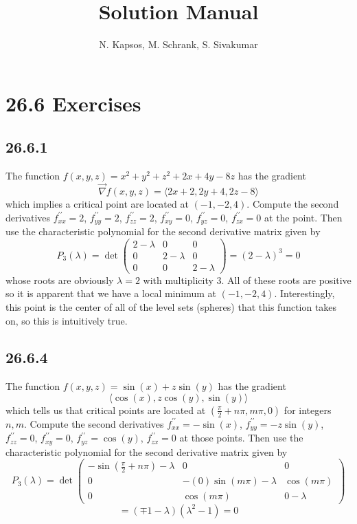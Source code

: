 \documentclass{article}
\title{Solution Manual}
\author{N. Kapsos, M. Schrank, S. Sivakumar}
\date{}
\begin{document}
\maketitle
\setcounter{secnumdepth}{0}

\section{26.6 Exercises}

\subsection{26.6.1}

The function $f(x,y,z) = x^2+y^2+z^2+2x + 4y-8z$ has the gradient $$\vec{\nabla}f(x,y,z) = \langle 2x+2, 2y+4 ,2z-8 \rangle$$ which implies a critical point are located at $(-1,-2,4)$. Compute the second derivatives $f^{\prime \prime}_{xx} = 2$, $f^{\prime \prime}_{yy} = 2$, $f^{\prime \prime}_{zz} = 2$, $f^{\prime \prime}_{xy} = 0$, $f^{\prime \prime}_{yz} = 0$, $f^{\prime \prime}_{zx} = 0$ at the point. Then use the characteristic polynomial for the second derivative matrix given by $$P_3(\lambda) = \det \begin{pmatrix}
    2-\lambda & 0 & 0 \\
    0 & 2-\lambda & 0 \\
    0 & 0 & 2-\lambda 
\end{pmatrix} = (2-\lambda)^3 = 0$$ whose roots are obviously $\lambda = 2$ with multiplicity $3$. All of these roots are positive so it is apparent that we have a local minimum at $(-1,-2,4)$. Interestingly, this point is the center of all of the level sets (spheres) that this function takes on, so this is intuitively true.
\subsection{26.6.4}

The function $f(x, y, z) = \sin (x) + z \sin (y)$ has the gradient $$\langle \cos(x), z\cos(y) ,\sin(y) \rangle$$ which tells us that critical points are located at $(\frac{\pi}{2}+n\pi,m\pi ,0)$ for integers $n,m$. Compute the second derivatives $f^{\prime \prime}_{xx} = -\sin(x)$, $f^{\prime \prime}_{yy} = -z\sin(y)$, $f^{\prime \prime}_{zz} = 0$, $f^{\prime \prime}_{xy} = 0$, $f^{\prime \prime}_{yz} = \cos(y)$, $f^{\prime \prime}_{zx} = 0$ at those points. Then use the characteristic polynomial for the second derivative matrix given by $$P_3(\lambda) = \det \begin{pmatrix}
    -\sin(\frac{\pi}{2}+n\pi)-\lambda & 0 & 0 \\
    0 & -(0)\sin(m\pi)-\lambda & \cos(m\pi) \\
    0 & \cos(m\pi) & 0-\lambda
\end{pmatrix}$$
$$ =  (\mp 1 - \lambda)(\lambda^2 - 1) = 0 $$
\end{document}
